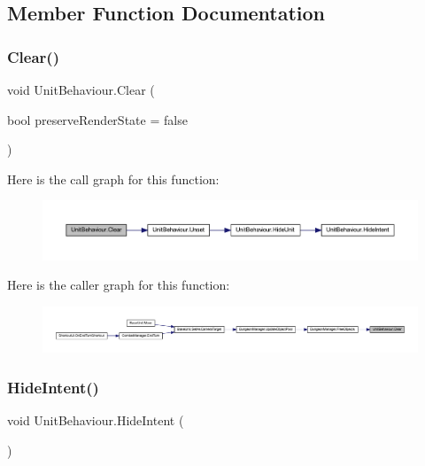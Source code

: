 \subsection{Member Function Documentation}
\mbox{\label{class_unit_behaviour_a89fa86241b11f695b89b7143fa4f88ec}} 
\subsubsection{\texorpdfstring{Clear()}{Clear()}}
{\footnotesize\ttfamily void Unit\+Behaviour.\+Clear (\begin{DoxyParamCaption}\item[{bool}]{preserve\+Render\+State = {\ttfamily false} }\end{DoxyParamCaption})}

Here is the call graph for this function\+:
\nopagebreak
\begin{figure}[H]
\begin{center}
\leavevmode
\includegraphics[width=350pt]{class_unit_behaviour_a89fa86241b11f695b89b7143fa4f88ec_cgraph}
\end{center}
\end{figure}
Here is the caller graph for this function\+:
\nopagebreak
\begin{figure}[H]
\begin{center}
\leavevmode
\includegraphics[width=350pt]{class_unit_behaviour_a89fa86241b11f695b89b7143fa4f88ec_icgraph}
\end{center}
\end{figure}
\mbox{\label{class_unit_behaviour_a9ba9de594c111333c048b477dd295025}} 
\subsubsection{\texorpdfstring{HideIntent()}{HideIntent()}}
{\footnotesize\ttfamily void Unit\+Behaviour.\+Hide\+Intent (\begin{DoxyParamCaption}{ }\end{DoxyParamCaption})}


